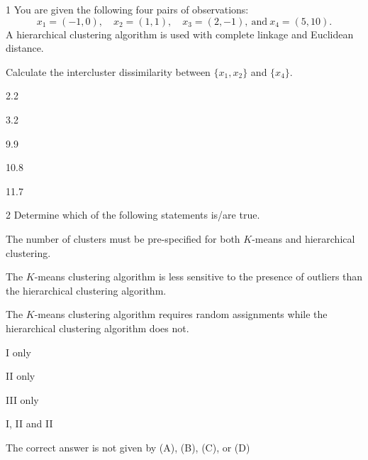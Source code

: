 
\begin{question}{1}
You are given the following four pairs of observations:
\[ x_1 = (-1, 0),\quad x_2 = (1, 1),\quad x_3 = (2, -1),\ \text{and}\ x_4 = (5, 10). \]
A hierarchical clustering algorithm is used with complete linkage and Euclidean distance.

Calculate the intercluster dissimilarity between $\{x_1, x_2\}$ and $\{x_4\}$.

\begin{choices}
\item 2.2
\item 3.2
\item 9.9
\item 10.8
\item 11.7
\end{choices}
\end{question}

\begin{question}{2}
Determine which of the following statements is/are true.
\begin{statements}
\item The number of clusters must be pre-specified for both $K$-means and hierarchical clustering.
\item The $K$-means clustering algorithm is less sensitive to the presence of outliers than the hierarchical clustering algorithm.
\item The $K$-means clustering algorithm requires random assignments while the hierarchical clustering algorithm does not.
\end{statements}

\begin{choices}
\item I only
\item II only
\item III only
\item I, II and II
\item The correct answer is not given by (A), (B), (C), or (D)
\end{choices}
\end{question}

